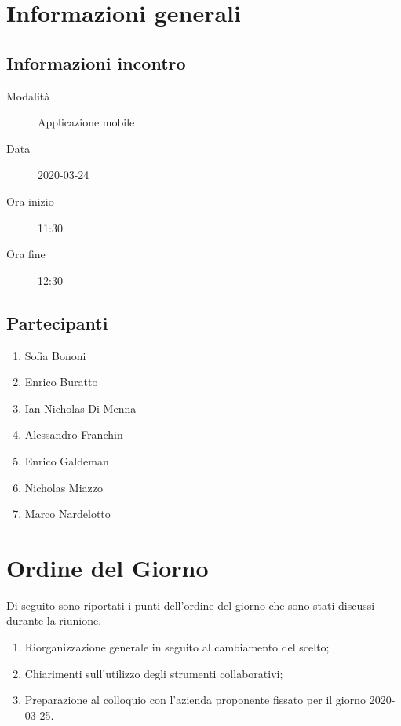 \documentclass{article}
\begin{document}


\section{Informazioni generali}%
\label{sec:informazioni_generali}

\subsection{Informazioni incontro}%
\label{sub:informazioni_incontro}

\begin{description}
  \item[Modalità] Applicazione mobile 
  \item[Data] 2020-03-24
  \item[Ora inizio] 11:30
  \item[Ora fine] 12:30
\end{description}

\subsection{Partecipanti}%
\label{sub:partecipanti}

\begin{enumerate}
  \item Sofia Bononi
  \item Enrico Buratto
  \item Ian Nicholas Di Menna
  \item Alessandro Franchin
  \item Enrico Galdeman
  \item Nicholas Miazzo
  \item Marco Nardelotto
\end{enumerate}

\section{Ordine del Giorno}%
\label{ordine_del_giorno}
Di seguito sono riportati i punti dell'ordine del giorno che sono stati discussi durante la riunione.
\begin{enumerate}
  \item Riorganizzazione generale in seguito al cambiamento del  scelto;
  \item Chiarimenti sull'utilizzo degli strumenti collaborativi;
  \item Preparazione al colloquio con l'azienda proponente fissato per il giorno 2020-03-25.
\end{enumerate}
\end{document}

